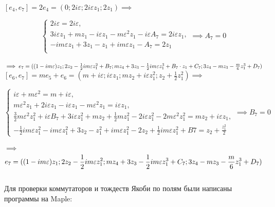 \documentclass[12pt]{article}
\begin{document}
$[e_4,e_7] = 2e_4 = (0; 2 i \varepsilon; 2 i \varepsilon z_1; 2 z_1) \implies $

\begin{equation*}
\begin{cases}
2 i \varepsilon = 2 i  \varepsilon, \\
3 i \varepsilon z_1 + m z_1 - i \varepsilon z_1 - m \varepsilon^2 z_1 - i \varepsilon A_7 = 2 i \varepsilon z_1,\\
- i m \varepsilon z_1 + 3 z_1 - z_1 + i m \varepsilon z_1 - A_7 =  2 z_1 \\

\end{cases}
\implies
A_7 = 0
\end{equation*}\\
$\implies e_7 = ((1 - i m \varepsilon)z_1 ;  2z_2 - \frac{1}{2} i m \varepsilon z_1^2 + B_7; \\
m z_4 + 3 z_3 - \frac{1}{2} i m \varepsilon z_1^3 + B_7 \cdot z_1 + C_7; 3 z_4 - m z_3 - \frac{m}{6} z_1^3 + D_7)$
\\

$[e_6,e_7] = m e_5 + e_6  = (m + i \varepsilon; i \varepsilon z_1; m z_2 + i \varepsilon z_1^2; z_2 + \frac{1}{2} z_1^2) \implies$

\begin{equation*}
\begin{cases}
i \varepsilon + m \varepsilon^2= m + i \varepsilon,\\
m \varepsilon^2 z_1 + 2 i \varepsilon z_1 - i \varepsilon z_1 - m \varepsilon^2 z_1 = i \varepsilon z_1, \\
\frac{3}{2} m \varepsilon^2 z_1^2 + i \varepsilon B_7 + 3 i \varepsilon z_1^2 + m z_2 + \frac{1}{2} m z_1^2 - 2 i \varepsilon z_1^2 - 2 m \varepsilon^2 z_1^2 = m z_2 + i \varepsilon z_1, \\
- \frac{1}{2} i m \varepsilon z_1^2 - i m \varepsilon z_1^2 +3 z_2 - z_1^2 + i m \varepsilon z_1^2 - 2 z_2 + \frac{1}{2} i m \varepsilon z_1^2 + B 7 = z_2 + \frac{z_1^2}{2}
\end{cases}
\implies
B_7 = 0
\end{equation*}\\
$\implies$
$$ e_7 = ((1 - i m \varepsilon)z_1;  2z_2 - \frac{1}{2} i m \varepsilon z_1^2; \\
m z_4 + 3 z_3 - \frac{1}{2} i m \varepsilon z_1^3 + C_7; 3 z_4 - m z_3 - \frac{m}{6} z_1^3 + D_7)$$
\\
Для проверки коммутаторов и тождеств Якоби по полям были написаны программы на Maple: \\
\end{document}
